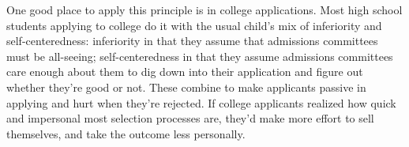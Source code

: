 One good place to
                  apply this principle is in college applications. Most high
                  school students applying to college do it with the usual
                  child's mix of inferiority and self-centeredness: inferiority
                  in that they assume that admissions committees must be
                  all-seeing; self-centeredness in that they assume admissions
                  committees care enough about them to dig down into their
                  application and figure out whether they're good or not. These
                  combine to make applicants passive in applying and hurt when
                  they're rejected. If college applicants realized how quick and
                  impersonal most selection processes are, they'd make more
                  effort to sell themselves, and take the outcome less
                  personally.


              
            
          

